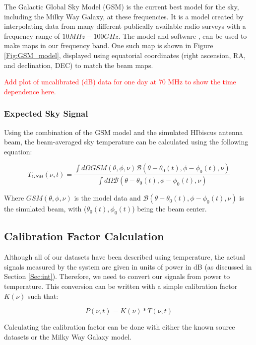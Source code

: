 The Galactic Global Sky Model (GSM) is the current best model for the sky, including the Milky Way Galaxy, at these frequencies. It is a model created by interpolating data from many different publically available radio surveys with a frequency range of $10 MHz - 100 GHz$. The model and software \cite{GSM_model}, can be used to make maps in our frequency band. One such map is shown in Figure \ref{Fig:GSM_model}, displayed using equatorial coordinates (right ascension, RA, and declination, DEC) to match the beam maps. 

\textcolor{red}{Add plot of uncalibrated (dB) data for one day at 70 MHz to show the time dependence here.}

\subsubsection{Expected Sky Signal}

Using the combination of the GSM model and the simulated HIbiscus antenna beam, the beam-averaged sky temperature can be calculated using the following equation: 

\begin{equation}
T_{GSM} (\nu,t) = \frac{ \int d \Omega GSM (\theta, \phi, \nu) \mathcal{B} (\theta - \theta_0(t), \phi - \phi_0(t),\nu)}{\int d\Omega \mathcal{B} (\theta -\theta_0(t), \phi - \phi_0(t), \nu)}
\end{equation}

Where $GSM (\theta, \phi, \nu)$ is the model data and $\mathcal{B} (\theta - \theta_0(t), \phi - \phi_0(t),\nu)$ is the simulated beam, with ($\theta_0 (t),\phi_0 (t)$) being the beam center. 

\subsection{Calibration Factor Calculation}

Although all of our datasets have been described using temperature, the actual signals measured by the system are given in units of power in dB (as discussed in Section \ref{Sec:int}). Therefore, we need to convert our signals from power to temperature. This conversion can be written with a simple calibration factor $K(\nu)$ such that:

\begin{equation}
P(\nu,t) = K(\nu)*T(\nu,t)
\end{equation}

Calculating the calibration factor can be done with either the known source datasets or the Milky Way Galaxy model. 

